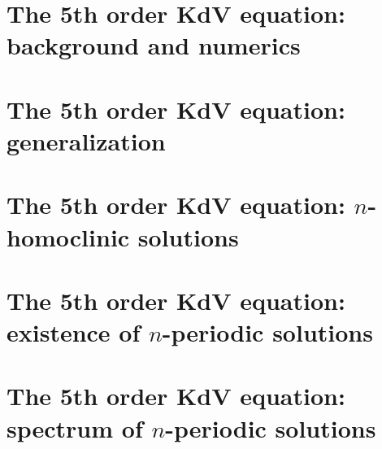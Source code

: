 \documentclass[11pt,reqno,oneside]{amsbook}
\theoremstyle{plain}
\theoremstyle{definition}
\theoremstyle{remark}
\numberwithin{section}{chapter}
\numberwithin{equation}{chapter}
\newif\iffulldocument
\begin{document}
\fulldocumenttrue

\mainmatter

\chapter{The 5th order KdV equation: background and numerics}\label{chapter:KdV5}



\chapter{The 5th order KdV equation: generalization}\label{chapter:kdv5general}



\chapter{The 5th order KdV equation: $n$-homoclinic solutions}\label{chapter:kdv5homoclinic}


\chapter{The 5th order KdV equation: existence of $n$-periodic solutions }\label{chapter:kdv5periodic}


\chapter{The 5th order KdV equation: spectrum of $n$-periodic solutions}\label{chapter:kdv5perspec}

% 

% 

\backmatter



\end{document}
